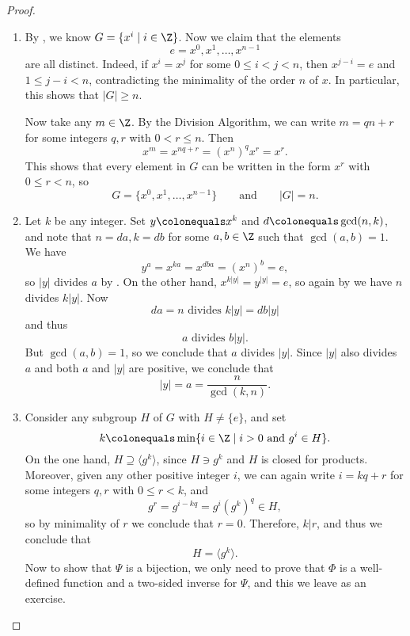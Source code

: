 \begin{proof}
\begin{enumerate}[label=(\alph*)]
\item By , we know $G=\{x^i \mid i \in \Z\}$. Now we claim that the elements 
$$e = x^0, x^1, \dots, x^{n-1}$$ 
are all distinct. Indeed, if $x^i=x^j$ for some $0\leqslant i<j<n$, then $x^{j-i}=e$ and $1 \leqslant j-i<n$, contradicting the minimality of the order $n$ of $x$. In particular, this shows that $|G| \geqslant n$.

Now take any $m \in \Z$. By the Division Algorithm, we can write $m = qn+r$ for some integers $q, r$ with $0 < r \leqslant n$. Then 
$$x^m=x^{nq+r}=(x^n)^qx^r=x^r.$$
This shows that every element in $G$ can be written in the form $x^r$ with $0 \leqslant r < n$, so
$$G = \{x^0, x^1, \dots, x^{n-1}\} \qquad \textrm{and} \qquad |G| = n.$$

\item Let $k$ be any integer. Set $y \colonequals x^k$ and $d \colonequals \gcd(n,k)$, and note that $n=da, k=db$ for some $a,b\in \Z$ such that $\gcd(a,b)=1$. 
We have
$$y^a=x^{ka}=x^{dba}=(x^n)^b=e,$$ 
so $|y|$ divides $a$ by . On the other hand, $x^{k|y|}=y^{|y|}=e$, so again by  we have $n$ divides $k|y|$. 
Now
$$da = n \textrm{ divides } k|y| = db|y|$$
and thus
$$a \textrm{ divides } b|y|.$$
But $\gcd(a,b)=1$, so we conclude that $a$ divides $|y|$.
Since $|y|$ also divides $a$ and both $a$ and $|y|$ are positive, we conclude that 
$$|y|=a=\frac{n}{\gcd(k,n)}.$$


\item Consider any subgroup $H$ of $G$ with $H \neq \{ e \}$, and set 
$$k \colonequals \min \{i \in \Z \mid i>0 \textrm{ and } g^i\in H\}.$$ 
On the one hand, $H \supseteq \langle g^k \rangle$, since $H \ni g^k$ and $H$ is closed for products. Moreover, given any other positive integer $i$, we can again write $i = kq+r$ for some integers $q, r$ with $0 \leqslant r < k$, and
$$g^r = g^{i-kq} = g^i (g^k)^q \in H,$$
so by minimality of $r$ we conclude that $r = 0$. Therefore, $k | r$, and thus we conclude that
$$H = \langle g^k \rangle.$$
Now to show that $\Psi$ is a bijection, we only need to prove that $\Phi$ is a well-defined function and a two-sided inverse for $\Psi$, and this we leave as an exercise.\qedhere
\end{enumerate}
\end{proof}


